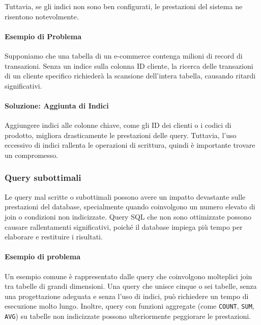 Tuttavia, se gli indici non sono ben configurati, le prestazioni del sistema ne risentono notevolmente.

\paragraph{Esempio di Problema}
Supponiamo che una tabella di un e-commerce contenga milioni di record di transazioni. Senza un indice sulla colonna ID cliente, la ricerca delle transazioni di un cliente specifico richiederà la scansione dell'intera tabella, causando ritardi significativi.

\paragraph{Soluzione: Aggiunta di Indici}
Aggiungere indici alle colonne chiave, come gli ID dei clienti o i codici di prodotto, migliora drasticamente le prestazioni delle query. Tuttavia, l'uso eccessivo di indici rallenta le operazioni di scrittura, quindi è importante trovare un compromesso.

\subsubsection{Query subottimali}
Le query mal scritte o subottimali possono avere un impatto devastante sulle prestazioni del database, specialmente quando coinvolgono un numero elevato di join o condizioni non indicizzate. Query SQL che non sono ottimizzate possono causare rallentamenti significativi, poiché il database impiega più tempo per elaborare e restituire i risultati.

\paragraph{Esempio di problema}
Un esempio comune è rappresentato dalle query che coinvolgono molteplici join tra tabelle di grandi dimensioni. Una query che unisce cinque o sei tabelle, senza una progettazione adeguata e senza l'uso di indici, può richiedere un tempo di esecuzione molto lungo. Inoltre, query con funzioni aggregate (come \texttt{COUNT}, \texttt{SUM}, \texttt{AVG}) su tabelle non indicizzate possono ulteriormente peggiorare le prestazioni.

